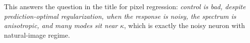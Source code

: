 
This answers the question in the title for pixel regression: \emph{control is bad, despite prediction-optimal regularization, when the response is noisy, the spectrum is anisotropic, and many modes sit near $\kappa$}, which is exactly the noisy neuron with natural-image regime.



